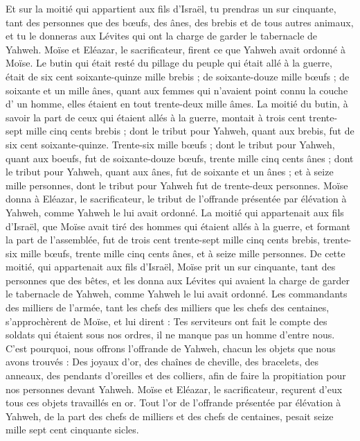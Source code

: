 \begin{multicols}{2}
Et sur la moitié qui appartient aux fils d'Israël, tu prendras un sur cinquante, tant des personnes que des bœufs, des ânes, des brebis et de tous autres animaux, et tu le donneras aux Lévites qui ont la charge de garder le tabernacle de Yahweh.
Moïse et Eléazar, le sacrificateur, firent ce que Yahweh avait ordonné à Moïse.
Le butin qui était resté du pillage du peuple qui était allé à la guerre, était de six cent soixante-quinze mille brebis ;
de soixante-douze mille bœufs ;
de soixante et un mille ânes,
quant aux femmes qui n'avaient point connu la couche d' un homme, elles étaient en tout trente-deux mille âmes.
La moitié du butin, à savoir la part de ceux qui étaient allés à la guerre, montait à trois cent trente-sept mille cinq cents brebis ;
dont le tribut pour Yahweh, quant aux brebis, fut de six cent soixante-quinze.
Trente-six mille bœufs ; dont le tribut pour Yahweh, quant aux boeufs, fut de soixante-douze bœufs,
trente mille cinq cents ânes ; dont le tribut pour Yahweh, quant aux ânes, fut de soixante et un ânes ;
et à seize mille personnes, dont le tribut pour Yahweh fut de trente-deux personnes.
Moïse donna à Eléazar, le sacrificateur, le tribut de l'offrande présentée par élévation à Yahweh, comme Yahweh le lui avait ordonné.
La moitié qui appartenait aux fils d'Israël, que Moïse avait tiré des hommes qui étaient allés à la guerre,
et formant la part de l'assemblée, fut de trois cent trente-sept mille cinq cents brebis,
trente-six mille bœufs,
trente mille cinq cents ânes,
et à seize mille personnes.
De cette moitié, qui appartenait aux fils d'Israël, Moïse prit un sur cinquante, tant des personnes que des bêtes, et les donna aux Lévites qui avaient la charge de garder le tabernacle de Yahweh, comme Yahweh le lui avait ordonné.
Les commandants des milliers de l'armée, tant les chefs des milliers que les chefs des centaines, s'approchèrent de Moïse,
et lui dirent : Tes serviteurs ont fait le compte des soldats qui étaient sous nos ordres, il ne manque pas un homme d'entre nous.
C'est pourquoi, nous offrons l'offrande de Yahweh, chacun les objets que nous avons trouvés : Des joyaux d'or, des chaînes de cheville, des bracelets, des anneaux, des pendants d'oreilles et des colliers, afin de faire la propitiation pour nos personnes devant Yahweh.
Moïse et Eléazar, le sacrificateur, reçurent d'eux tous ces objets travaillés en or.
Tout l'or de l'offrande présentée par élévation à Yahweh, de la part des chefs de milliers et des chefs de centaines, pesait seize mille sept cent cinquante sicles.

\end{multicols}
